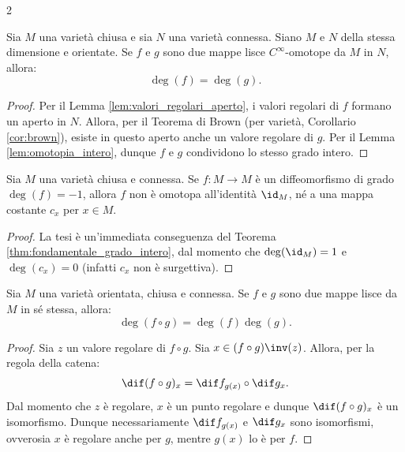 \begin{multicols*}{2}
    \begin{theorem} \label{thm:fondamentale_grado_intero}
        Sia $M$ una varietà chiusa e sia $N$ una varietà connessa.
        Siano $M$ e $N$ della stessa dimensione e orientate.
        Se $f$ e $g$ sono due mappe lisce $C^\infty$-omotope da $M$ in $N$,
        allora:
        \[
            \boxed{\deg(f) = \deg(g).}
        \]
    \end{theorem}

    \begin{proof}
        Per il Lemma \ref{lem:valori_regolari_aperto}, i valori regolari di $f$ formano un aperto in $N$. Allora, per il Teorema
        di Brown (per varietà, Corollario \ref{cor:brown}), esiste in questo
        aperto anche un valore regolare di $g$. Per il Lemma \ref{lem:omotopia_intero},
        dunque $f$ e $g$ condividono lo stesso grado intero.
    \end{proof}

    \begin{corollary}
        Sia $M$ una varietà chiusa e connessa. Se $f : M \to M$
        è un diffeomorfismo di grado $\deg(f) = -1$, allora
        $f$ non è omotopa all'identità $\id_M$, né a una mappa costante $c_x$ per
        $x \in M$.
    \end{corollary}

    \begin{proof}
        La tesi è un'immediata conseguenza del Teorema \ref{thm:fondamentale_grado_intero},
        dal momento che $\deg(\id_M) = 1$ e $\deg(c_x) = 0$ (infatti $c_x$ non è surgettiva).
    \end{proof}

    \begin{proposition} \label{prop:grado_moltiplicativo}
        Sia $M$ una varietà orientata, chiusa e connessa. Se $f$ e $g$ sono due
        mappe lisce da $M$ in sé stessa, allora:
        \[
            \boxed{\deg(f \circ g) = \deg(f) \deg(g).}
        \]
    \end{proposition}

    \begin{proof}
        Sia $z$ un valore regolare di $f \circ g$. Sia $x \in (f \circ g)\inv(z)$.
        Allora, per la regola della catena:
        \[
            \dif (f \circ g)_x = \dif f_{g(x)} \circ \dif g_x.
        \]
        Dal momento che $z$ è regolare, $x$ è un punto regolare e dunque
        $\dif (f \circ g)_x$ è un isomorfismo. Dunque necessariamente
        $\dif f_{g(x)}$ e $\dif g_x$ sono isomorfismi, ovverosia
        $x$ è regolare anche per $g$, mentre $g(x)$ lo è per $f$. \smallskip


\end{proof}
\end{multicols*}
